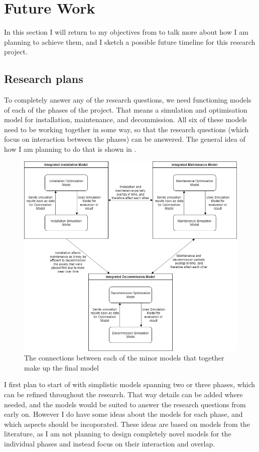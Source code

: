 \documentclass[a4paper,12pt]{article}
\begin{document}
\pagebreak

\section{Future Work} \label{s:concl}
In this section I will return to my objectives from  to talk more about how I am planning to achieve them, and I sketch a possible future timeline for this research project. 

\subsection{Research plans} \label{ss:plans}
To completely answer any of the research questions, we need functioning models of each of the phases of the project. That means a simulation and optimisation model for installation, maintenance, and decommission. All six of these models need to be working together in some way, so that the research questions (which focus on interaction between the phases) can be answered. The general idea of how I am planning to do that is shown in . 

\begin{figure}[h]
\includegraphics[width = \textwidth]{OWF Tool interactions}
\caption{The connections between each of the minor models that together make up the final model}
\label{f:interact}
\end{figure}

I first plan to start of with simplistic models spanning two or three phases, which can be refined throughout the research. That way details can be added where needed, and the models would be suited to answer the research questions from early on. However I do have some ideas about the models for each phase, and which aspects should be incoporated. These ideas are based on models from the literature, as I am not planning to design completely novel models for the individual phases and instead focus on their interaction and overlap. 
\end{document}
